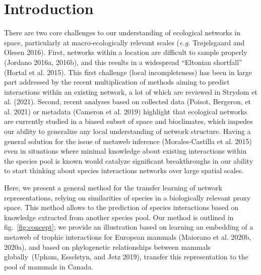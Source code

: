 \documentclass[10pt,oneside]{article}
\begin{document}
\hypertarget{introduction}{%
\section{Introduction}\label{introduction}}

There are two core challenges to our understanding of ecological
networks in space, particularly at macro-ecologically relevant scales
(\emph{e.g.} Trøjelsgaard and Olesen 2016). First, networks within a
location are difficult to sample properly (Jordano 2016a, 2016b), and
this results in a widespread ``Eltonian shortfall'' (Hortal et al.
2015). This first challenge (local incompleteness) has been in large
part addressed by the recent multiplication of methods aiming to predict
interactions within an existing network, a lot of which are reviewed in
Strydom et al. (2021). Second, recent analyses based on collected data
(Poisot, Bergeron, et al. 2021) or metadata (Cameron et al. 2019)
highlight that ecological networks are currently studied in a biased
subset of space and bioclimates, which impedes our ability to generalize
any local understanding of network structure. Having a general solution
for the issue of metaweb inference (Morales-Castilla et al. 2015) even
in situations where minimal knowledge about existing interactions within
the species pool is known would catalyze significant breakthroughs in
our ability to start thinking about species interactions networks over
large spatial scales.

Here, we present a general method for the transfer learning of network
representations, relying on similarities of species in a biologically
relevant proxy space. This method allows to the prediction of species
interactions based on knowledge extracted from another species pool. Our
method is outlined in fig.~\ref{fig:concept}; we provide an illustration
based on learning an embedding of a metaweb of trophic interactions for
European mammals (Maiorano et al. 2020b, 2020a), and based on
phylogenetic relationships between mammals globally~(Upham, Esselstyn,
and Jetz 2019), transfer this representation to the pool of mammals in
Canada.
\end{document}
